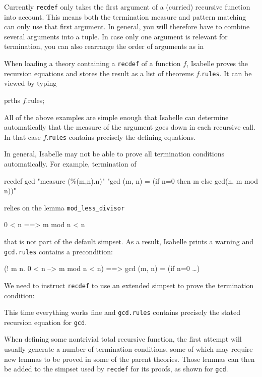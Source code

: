 \begin{warn}
  Currently \texttt{recdef} only takes the first argument of a (curried)
  recursive function into account. This means both the termination measure
  and pattern matching can only use that first argument. In general, you will
  therefore have to combine several arguments into a tuple. In case only one
  argument is relevant for termination, you can also rearrange the order of
  arguments as in
\begin{ttbox}
\end{ttbox}
\end{warn}

When loading a theory containing a \texttt{recdef} of a function $f$,
Isabelle proves the recursion equations and stores the result as a list of
theorems $f$.\texttt{rules}. It can be viewed by typing
\begin{ttbox}
prths \(f\).rules;
\end{ttbox}
All of the above examples are simple enough that Isabelle can determine
automatically that the measure of the argument goes down in each recursive
call. In that case $f$.\texttt{rules} contains precisely the defining
equations.

In general, Isabelle may not be able to prove all termination conditions
automatically. For example, termination of
\begin{ttbox}
recdef gcd "measure (\%(m,n).n)"
  "gcd (m, n) = (if n=0 then m else gcd(n, m mod n))"
\end{ttbox}
relies on the lemma \texttt{mod_less_divisor}
\begin{ttbox}
0 < n ==> m mod n < n
\end{ttbox}
that is not part of the default simpset. As a result, Isabelle prints a
warning and \texttt{gcd.rules} contains a precondition:
\begin{ttbox}
(! m n. 0 < n --> m mod n < n) ==> gcd (m, n) = (if n=0 \dots)
\end{ttbox}
We need to instruct \texttt{recdef} to use an extended simpset to prove the
termination condition:
\begin{ttbox}
\end{ttbox}
This time everything works fine and \texttt{gcd.rules} contains precisely the
stated recursion equation for \texttt{gcd}.

When defining some nontrivial total recursive function, the first attempt
will usually generate a number of termination conditions, some of which may
require new lemmas to be proved in some of the parent theories. Those lemmas
can then be added to the simpset used by \texttt{recdef} for its
proofs, as shown for \texttt{gcd}.

